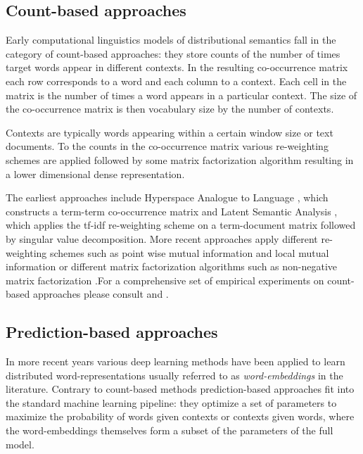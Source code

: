 \subsection{Count-based approaches}
\label{sec:count}

Early computational linguistics models of distributional semantics fall in the category of
count-based approaches: they store counts of the number of times target words appear in different
contexts. In the resulting co-occurrence matrix
each row corresponds to a
word and each column to a context. Each cell in the matrix is the number of times a word 
appears in a particular context.
The size of the co-occurrence matrix is then vocabulary size by the number of contexts.

Contexts are typically words appearing within a certain window size or text documents.
To the counts in the co-occurrence matrix various re-weighting schemes are applied followed 
by some matrix factorization algorithm resulting in a lower dimensional dense representation.

The earliest approaches include Hyperspace Analogue to Language \citep{lund1996producing},
which constructs a term-term co-occurrence matrix and Latent Semantic Analysis \citep{dumais2004latent},
which applies the tf-idf re-weighting scheme on a term-document matrix
followed by singular value decomposition.
More recent approaches apply different re-weighting schemes such as
point wise mutual information \citep{bullinaria2007extracting}  and local mutual
information \citep{evert2005statistics} or different matrix factorization algorithms such as non-negative
matrix factorization \citep{baroni2014don}.For a comprehensive set of empirical experiments on count-based
approaches please consult \cite{bullinaria2007extracting} and \cite{bullinaria2012extracting}.

\subsection{Prediction-based approaches}
\label{sec:pred}
In more recent years
various deep learning methods have been applied to learn distributed word-representations usually referred to
as \emph{word-embeddings} in the literature.
Contrary to count-based methods prediction-based approaches fit into the
standard machine learning pipeline: they optimize a set of parameters to maximize the probability of words
given contexts or contexts given words, where the word-embeddings 
themselves form a subset of the parameters of the full model.

